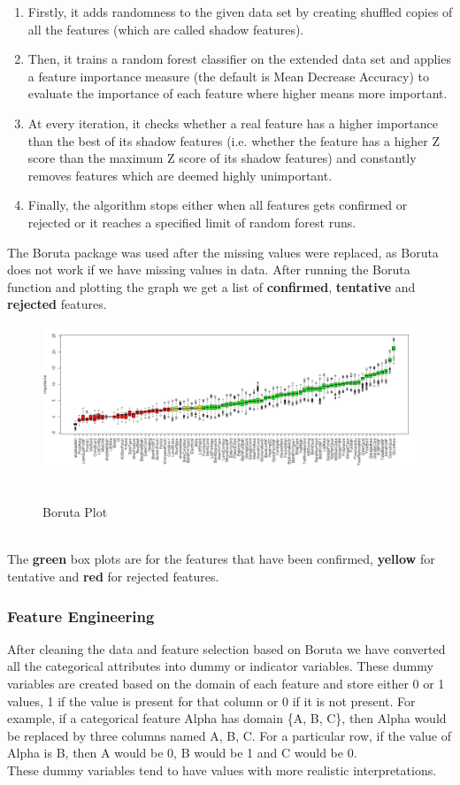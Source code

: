 \documentclass[fleqn,10pt]{SelfArx} %
\begin{document}
\begin{enumerate}[noitemsep]
\item Firstly, it adds randomness to the given data set by creating shuffled copies of all the features (which are called shadow features).
\item Then, it trains a random forest classifier on the extended data set and applies a feature importance measure (the default is Mean Decrease Accuracy) to evaluate the importance of each feature where higher means more important.
\item At every iteration, it checks whether a real feature has a higher importance than the best of its shadow features (i.e. whether the feature has a higher Z score than the maximum Z score of its shadow features) and constantly removes features which are deemed highly unimportant.
\item Finally, the algorithm stops either when all features gets confirmed or rejected or it reaches a specified limit of random forest runs.
\end{enumerate}
The Boruta package was used after the missing values were replaced, as Boruta does not work if we have missing values in data.
After running the Boruta function and plotting the graph we get a list of \textbf{confirmed}, \textbf{tentative} and \textbf{rejected} features.
\begin{figure}[h]
\includegraphics[scale=0.21]{Boruta}
\\ \caption{\\Boruta Plot}
\end{figure}
\\ The \textbf{green} box plots are for the features that have been confirmed, \textbf{yellow} for tentative and \textbf{red} for rejected features.
\subsubsection{Feature Engineering}
After cleaning the data and feature selection based on Boruta we have converted all the categorical attributes into dummy or indicator variables. These dummy variables are created based on the domain of each feature and store either 0 or 1 values, 1 if the value is present for that column or 0 if it is not present. For example, if a categorical feature Alpha has domain \{A, B, C\}, then Alpha would be replaced by three columns named A, B, C. For a particular row, if the value of Alpha is B, then A would be 0, B would be 1 and C would be 0.
\\ These dummy variables tend to have values with more realistic interpretations.
\end{document}
